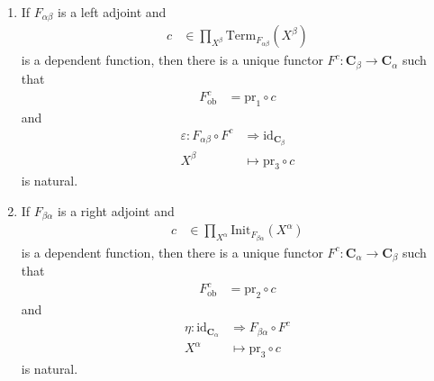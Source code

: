 \begin{lem}
\label{lem:adjointto}
\begin{enumerate}
\item[(1T)]
If $F_{\alpha\beta}$ is a left adjoint and 
\begin{align*}
  c
  &\in
  \prod_{X^{\beta}}
  \mathrm{Term}_{F_{\alpha\beta}}(X^{\beta})
\end{align*}
is a dependent function, then there is a unique functor $F^{c} \colon \mathbf{C}_{\beta} \rightarrow \mathbf{C}_{\alpha}$ such that
\begin{align*}
  F_{\mathrm{ob}}^{c}
  &=
  \mathrm{pr}_{1}
  \circ
  c
\end{align*}
and
\begin{align*}
  \varepsilon
  \colon
  F_{\alpha\beta}
  \circ
  F^{c}
  &\Rightarrow
  \mathrm{id}_{\mathbf{C}_{\beta}}
  \\
  X^{\beta}
  &\mapsto
  \mathrm{pr}_{3}
  \circ
  c
\end{align*}
is natural.
\item[(1I)]
If $F_{\beta\alpha}$ is a right adjoint and 
\begin{align*}
  c
  &\in
  \prod_{X^{\alpha}}
  \mathrm{Init}_{F_{\beta\alpha}}(X^{\alpha})
\end{align*}
is a dependent function, then there is a unique functor $F^{c} \colon \mathbf{C}_{\alpha} \rightarrow \mathbf{C}_{\beta}$ such that
\begin{align*}
  F_{\mathrm{ob}}^{c}
  &=
  \mathrm{pr}_{2}
  \circ
  c
\end{align*}
and
\begin{align*}
  \eta
  \colon
  \mathrm{id}_{\mathbf{C}_{\alpha}}
  &\Rightarrow
  F_{\beta\alpha}
  \circ
  F^{c}
  \\
  X^{\alpha}
  &\mapsto
  \mathrm{pr}_{3}
  \circ
  c
\end{align*}
is natural.
\end{enumerate}
\end{lem}
